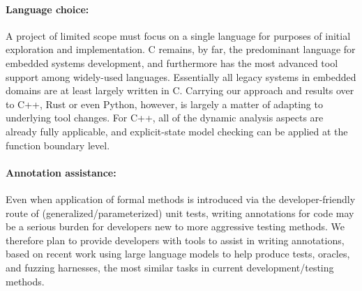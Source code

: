 \paragraph{Language choice:} A project of limited scope must focus on a single  language for purposes of initial exploration and implementation.  C remains, by far, the predominant language for embedded systems development, and furthermore has the most advanced tool support among widely-used languages.  Essentially all legacy systems in embedded domains are at least largely written in C.  Carrying our approach and results over to C++, Rust or even Python, however, is largely a matter of adapting to underlying tool changes.  For C++, all of the dynamic analysis aspects are already fully applicable, and explicit-state model checking can be applied at the function boundary level.

\paragraph{Annotation assistance:}  Even when application of formal methods is introduced via the developer-friendly route of (generalized/parameterized) unit tests, writing annotations for code may be a serious burden for developers new to more aggressive testing methods.  We therefore plan to provide developers with tools to assist in writing annotations, based on recent work using large language models to help produce tests, oracles, and fuzzing harnesses, the most similar tasks in current development/testing methods.

